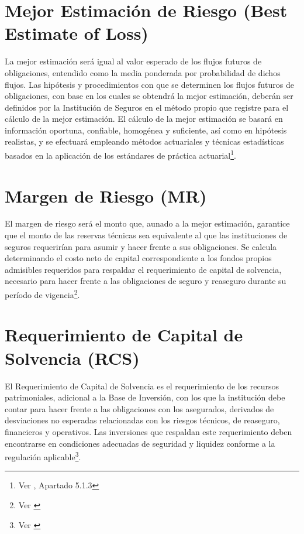 \documentclass[11pt,twoside,openright,spanish]{report}
\numberwithin{equation}{chapter}
\numberwithin{figure}{chapter}
\numberwithin{table}{chapter}
\begin{document}
	\section{Mejor Estimación de Riesgo (Best Estimate of Loss)}
	
	La mejor estimación será igual al valor esperado de los flujos futuros de obligaciones, entendido como la media ponderada por probabilidad de dichos flujos. Las hipótesis y procedimientos con que se determinen los flujos futuros de obligaciones, con base en los cuales se obtendrá la mejor estimación, deberán ser definidos por la Institución de Seguros en el método propio que registre para el cálculo de la mejor estimación. El cálculo de la mejor estimación se basará en información oportuna, confiable, homogénea y suficiente, así como en hipótesis realistas, y se efectuará empleando métodos actuariales y técnicas estadísticas basados en la aplicación de los estándares de práctica actuarial\footnote{Ver \citet{HCusf}, Apartado 5.1.3}.
	
	\section{Margen de Riesgo (MR)}
	
	El margen de riesgo será el monto que, aunado a la mejor estimación, garantice que el monto de las reservas técnicas sea equivalente al que las instituciones de seguros requerirían para asumir y hacer frente a sus obligaciones. Se calcula determinando el costo neto de capital correspondiente a los fondos propios admisibles requeridos para respaldar el requerimiento de capital de solvencia, necesario para hacer frente a las obligaciones de seguro y reaseguro durante su período de vigencia\footnote{Ver \citet{USolvii}}.
	
	\section{Requerimiento de Capital de Solvencia (RCS)}
	
	El Requerimiento de Capital de Solvencia es el requerimiento de los recursos patrimoniales, adicional a la Base de Inversión, con los que la institución debe contar para hacer frente a las obligaciones con los asegurados, derivados de desviaciones no esperadas relacionadas con los riesgos técnicos, de reaseguro, financieros y operativos. Las inversiones que respaldan este requerimiento deben encontrarse en condiciones adecuadas de seguridad y liquidez conforme a la regulación aplicable\footnote{Ver \citet{NRCS}}.
	
\end{document}
